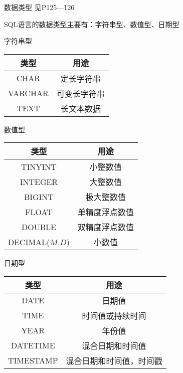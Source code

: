 \documentclass[t]{beamer}
\begin{document}
\begin{frame}{数据类型}
见P125---126

SQL语言的数据类型主要有：字符串型、数值型、日期型

\begin{center}
  字符串型
  
  \begin{tabular}{cc}
    \hline
    类型  &  用途  \\
    \hline
CHAR & 定长字符串\\
VARCHAR & 可变长字符串\\
TEXT & 长文本数据\\
    \hline
  \end{tabular}
\end{center}
\end{frame}

\begin{frame}{数值型}
  \begin{center}
    \begin{tabular}{cc}
      \hline
      类型  &  用途  \\
      \hline
  TINYINT  & 小整数值 \\
INTEGER  & 大整数值 \\
BIGINT &  极大整数值\\
FLOAT & 单精度浮点数值\\
DOUBLE & 双精度浮点数值\\
DECIMAL($M$,$D$)  & 小数值\\
      \hline
    \end{tabular}
  \end{center}
\end{frame}




\begin{frame}{日期型}
  \begin{center}
    \begin{tabular}{cc}
      \hline
      类型  &  用途  \\
      \hline
  DATE & 日期值 \\
  TIME & 时间值或持续时间\\
  YEAR & 年份值\\
DATETIME & 混合日期和时间值 \\ 
TIMESTAMP &   混合日期和时间值，时间戳 \\
      \hline
    \end{tabular}
  \end{center}
\end{frame}
\end{document}
